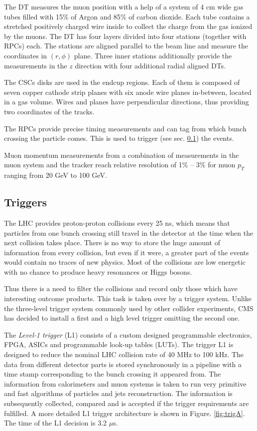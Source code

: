 The DT measures the muon position with a help of a system of 4 cm wide gas tubes filled with 15$\%$ of Argon and 85$\%$ of carbon dioxide.
Each tube contains a stretched positively charged wire inside to collect the charge from the gas ionized by the muons. The DT has four layers
divided into four stations (together with RPCs) each. The stations are aligned parallel to the beam line and measure the coordinates in $(r,\phi)$
plane. Three inner stations additionally provide the measurements in the $z$ direction with four additional radial aligned DTs.

The CSCs disks are used in the endcup regions. Each of them is composed of seven copper cathode strip planes with six anode wire planes in-between, located in 
a gas volume. Wires and planes have perpendicular directions, thus providing two coordinates of the tracks.

The RPCs provide precise timing measurements and can tag from which bunch crossing the particle comes. This is used to trigger (see sec. \ref{sec:trig})
the events.

Muon momentum measurements from a combination of measurements in the muon system and the tracker reach relative resolution of 1$\%$ -- 3$\%$ for muon $p_{T}$
ranging from 20 GeV to 100 GeV.

\subsection{Triggers}\label{sec:trig}

The LHC provides proton-proton collisions every 25 ns, which means that particles from one bunch crossing still travel in the detector at 
the time when the next collision takes place. There is no way to store the huge amount of information from every collision, but even if it were,
a greater part of the events would contain no traces of new physics. Most of the collisions are low energetic with no chance
to produce heavy resonances or Higgs bosons.

Thus there is a need to filter the collisions and record only those which have interesting outcome products. This task is taken over by a trigger
system\cite{CMSatLHC}. Unlike the three-level trigger system commonly used by other collider experiments, CMS has decided to install a first and a high
level trigger omitting the second one.

The \textit{Level-1 trigger} (L1) consists of a custom designed programmable electronics, FPGA, ASICs and programmable look-up tables (LUTs).
The trigger L1 is designed to reduce the nominal LHC collision rate of 40 MHz to 100 kHz. The data from different detector parts is stored
synchronously in a pipeline with a time stamp corresponding to the bunch crossing it appeared from. The information from calorimeters and muon systems is taken to run very primitive
and fast algorithms of particles and jets reconstruction. The information is subsequently collected, compared and is accepted if the trigger
requirements are fulfilled. A more detailed L1 trigger architecture is shown in Figure. \ref{fig:trigA}. The time of the L1 decision is 3.2 $\mu$s. 

